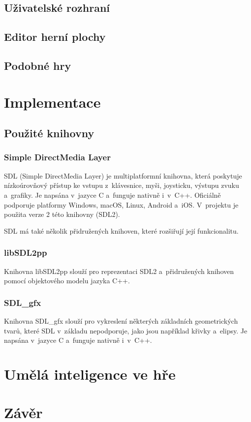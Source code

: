 \section{Uživatelské rozhraní}


\section{Editor herní plochy}

\section{Podobné hry}


\chapter{Implementace}

\section{Použité knihovny}

\subsection*{Simple DirectMedia Layer}

SDL (Simple DirectMedia Layer) je multiplatformní knihovna, která poskytuje nízkoúrovňový přístup ke vstupu z~klávesnice, myši, joysticku, výstupu zvuku a~grafiky. Je napsána v~jazyce C a~funguje nativně i~v~C++. Oficiálně podporuje platformy Windows, macOS, Linux, Android a~iOS. V~projektu je použita verze 2 této knihovny (SDL2).

SDL má také několik přidružených knihoven, které rozšiřují její funkcionalitu. 

\subsection*{libSDL2pp}

Knihovna libSDL2pp slouží pro reprezentaci SDL2 a~přidružených knihoven pomocí objektového modelu jazyka C++.

\subsection*{SDL\_gfx}

Knihovna SDL\_gfx slouží pro vykreslení některých základních geometrických tvarů, které SDL v~základu nepodporuje, jako jsou například křivky a~elipsy. Je napsána v~jazyce C a~funguje nativně i~v~C++.


\chapter{Umělá inteligence ve hře}


\chapter{Závěr}

